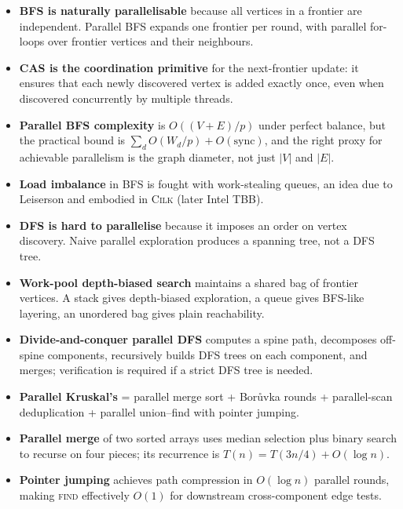 \begin{ppnote}
\begin{itemize}
  \item \textbf{BFS is naturally parallelisable} because all vertices in
        a frontier are independent.  Parallel BFS expands one frontier
        per round, with parallel for-loops over frontier vertices and
        their neighbours.
  \item \textbf{CAS is the coordination primitive} for the next-frontier
        update: it ensures that each newly discovered vertex is added
        exactly once, even when discovered concurrently by multiple
        threads.
  \item \textbf{Parallel BFS complexity} is $O((V+E)/p)$ under perfect
        balance, but the practical bound is
        $\sum_d O(W_d/p) + O(\text{sync})$, and the right proxy for
        achievable parallelism is the graph diameter, not just $|V|$
        and $|E|$.
  \item \textbf{Load imbalance} in BFS is fought with work-stealing
        queues, an idea due to Leiserson and embodied in
        \textsc{Cilk} (later Intel TBB).
  \item \textbf{DFS is hard to parallelise} because it imposes an
        order on vertex discovery.  Naive parallel exploration produces
        a spanning tree, not a DFS tree.
  \item \textbf{Work-pool depth-biased search} maintains a shared bag
        of frontier vertices.  A stack gives depth-biased exploration,
        a queue gives BFS-like layering, an unordered bag gives plain
        reachability.
  \item \textbf{Divide-and-conquer parallel DFS} computes a spine
        path, decomposes off-spine components, recursively builds
        DFS trees on each component, and merges; verification is
        required if a strict DFS tree is needed.
  \item \textbf{Parallel Kruskal's} = parallel merge sort + Bor\r{u}vka
        rounds + parallel-scan deduplication + parallel union--find
        with pointer jumping.
  \item \textbf{Parallel merge} of two sorted arrays uses median
        selection plus binary search to recurse on four pieces; its
        recurrence is $T(n) = T(3n/4) + O(\log n)$.
  \item \textbf{Pointer jumping} achieves path compression in
        $O(\log n)$ parallel rounds, making \textsc{find} effectively
        $O(1)$ for downstream cross-component edge tests.
\end{itemize}
\end{ppnote}

